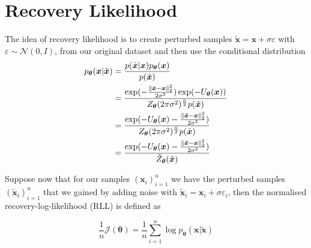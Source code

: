 \section{Recovery Likelihood}

\begin{comment}
Let $\bm{x} \sim p_{\text{data}}(\bm{x})$ denote a training example, and $p_{\bm{\theta}}(\bm{x})$ denote a model’s probability density function 
that aims to approximates $p_{\text{data}}(\bm{x})$. 
An energy-based model (EBM) is defined as:

\[
	p_{\bm{\theta}}(\bm{x}) = \frac{1}{Z_{\bm{\theta}}} \exp( - U_{\bm{\theta}} (\bm{x}) )
\]

where $Z_{\bm{\theta}} = \int \exp( - U_{\bm{\theta}} (\bm{x}) ) d\bm{x}$ is the partition function which is analytically intractable for high dimensional $\bm{x}$.
\end{comment}

The idea of recovery likelihood is to create perturbed samples $\tilde{\bm{x}} = \bm{x} + \sigma \varepsilon$ with $\varepsilon \sim \mathcal{N}(0, I)$, 
from our original dataset and then use the conditional distribution
\[
\begin{aligned}
	p_{\bm{\theta}}(\bm{x} | \tilde{\bm{x}}) &=  \frac{ p(\tilde{\bm{x}} | \bm{x})  p_{\bm{\theta}}(\bm{x}) }{ p(\tilde{\bm{x}}) } \\
	&= \frac{ \exp( -\frac{ \left\lVert\tilde{\bm{x}} - \bm{x}\right\rVert_{2}^2 }{ 2 \sigma^2 })  \exp( - U_{\bm{\theta}} (\bm{x}) ) }{ Z_{\bm{\theta}} (2\pi \sigma^2)^{ \frac{n}{2} } p(\tilde{\bm{x}}) } \\
	&= \frac{ \exp( - U_{\bm{\theta}} (\bm{x}) - \frac{ \left\lVert\tilde{\bm{x}} - \bm{x}\right\rVert_{2}^2 }{ 2 \sigma^2 }) }{ Z_{\bm{\theta}} (2\pi \sigma^2)^{ \frac{n}{2} } p(\tilde{\bm{x}}) } \\
	&= \frac{ \exp( -U_{\bm{\theta}} (\bm{x}) - \frac{ \left\lVert\tilde{\bm{x}} - \bm{x}\right\rVert_{2}^2 }{ 2 \sigma^2 }) }{ \tilde{Z}_{\bm{\theta}} (\tilde{\bm{x}}) } \\
\end{aligned}
\]

Suppose now that for our samples $(\bm{x}_i )_{i=1}^n $ we have the perturbed samples $(\tilde{\bm{x}}_i )_{i=1}^n $ that we gained by adding noise with
$\tilde{\bm{x}}_i = \bm{x}_i + \sigma \varepsilon_i$, then the normalised recovery-log-likelihood (RLL) is defined as

\[
	\frac{1}{n} \mathcal{J}(\bm{\theta}) = \frac{1}{n} \sum_{i=1}^n \log p_{\bm{\theta}}(\bm{x} | \tilde{\bm{x}})
\]

